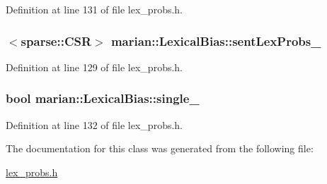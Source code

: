 Definition at line 131 of file lex\+\_\+probs.\+h.

\subsubsection[{\texorpdfstring{sent\+Lex\+Probs\+\_\+}{sentLexProbs_}}]{$<${\bf sparse\+::\+C\+SR}$>$ marian\+::\+Lexical\+Bias\+::sent\+Lex\+Probs\+\_\+\hspace{0.3cm}{\ttfamily [private]}}\hypertarget{classmarian_1_1LexicalBias_a88bd39c6ff99b3f8414ae93ca12ac520}{}\label{classmarian_1_1LexicalBias_a88bd39c6ff99b3f8414ae93ca12ac520}


Definition at line 129 of file lex\+\_\+probs.\+h.

\subsubsection[{\texorpdfstring{single\+\_\+}{single_}}]{\setlength{\rightskip}{0pt plus 5cm}bool marian\+::\+Lexical\+Bias\+::single\+\_\+\hspace{0.3cm}{\ttfamily [private]}}\hypertarget{classmarian_1_1LexicalBias_aff01be8467b5f74284af2f620dfefac5}{}\label{classmarian_1_1LexicalBias_aff01be8467b5f74284af2f620dfefac5}


Definition at line 132 of file lex\+\_\+probs.\+h.



The documentation for this class was generated from the following file\+:\begin{DoxyCompactItemize}
\item 
\hyperlink{lex__probs_8h}{lex\+\_\+probs.\+h}\end{DoxyCompactItemize}

